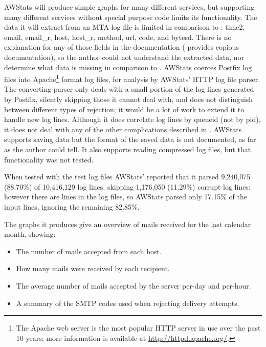 AWStats will produce simple graphs for many different services, but
supporting many different services without special purpose code limits its
functionality.  The data it will extract from an \gls{MTA} log file is
limited in comparison to \parsername{}: time2, email, email\_r, host,
host\_r, method, url, code, and bytesd.  There is no explanation for any of
those fields in the documentation (\parsername{} provides copious
documentation), so the author could not understand the extracted data, nor
determine what data is missing in comparison to \parsername{}.  AWStats
coerces Postfix log files into Apache\footnote{The Apache web server is the
most popular HTTP server in use over the past 10 years; more information is
available at \url{http://httpd.apache.org/}.} format log files, for
analysis by AWStats' HTTP log file parser.  The converting parser only
deals with a small portion of the log lines generated by Postfix, silently
skipping those it cannot deal with, and does not distinguish between
different types of rejection; it would be a lot of work to extend it to
handle new log lines.  Although it does correlate log lines by queueid (not
by pid), it does not deal with any of the other complications described in
.  AWStats supports saving data but the format of
the saved data is not documented, as far as the author could tell.  It also
supports reading compressed log files, but that functionality was not
tested.

When tested with the \numberOFlogFILES{} test log files AWStats' reported
that it parsed 9,240,075 (88.70\%) of 10,416,129 log lines, skipping
1,176,050 (11.29\%) corrupt log lines; however there are
\numberOFlogLINES{} lines in the \numberOFlogFILES{} log files, so AWStats
parsed only 17.15\% of the input lines, ignoring the remaining 82.85\%.

The graphs it produces give an overview of mails received for the last
calendar month, showing:

\begin{itemize}

    \item The number of mails accepted from each host.

    \item How many mails were received by each recipient.

    \item The average number of mails accepted by the server per-day and
        per-hour.

    \item A summary of the \gls{SMTP} codes used when rejecting delivery
        attempts.

\end{itemize}

